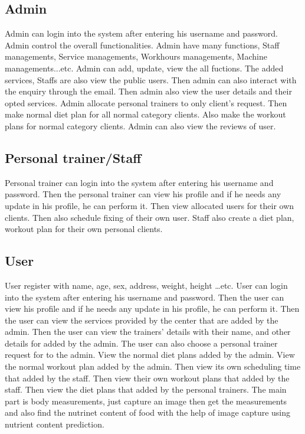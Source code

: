 \documentclass[a4paper,12pt,toc=flat]{report}
\begin{document}
{	\subsection{Admin}
	
	Admin can login into the system after entering his username and password. Admin control the overall functionalities. Admin have many functions, Staff managements, Service managements, Workhours managements, Machine managements...etc. Admin can add, update, view the all fuctions. The added services, Staffs are also view the public users. Then admin can also interact with the enquiry through the email. Then admin also view the user details and their opted services. Admin allocate personal trainers to only client’s request. Then make normal diet plan for all normal category clients. Also make the workout plans for normal category clients. Admin can also view the reviews of user.
	\subsection{Personal trainer/Staff}
	
	Personal trainer can login into the system after entering his username and password. Then the personal trainer can view his profile and if he needs any update in his profile, he can perform it. Then view allocated users for their own clients. Then also schedule fixing of their own user. Staff  also create a diet plan, workout plan  for their own personal clients.
	\pagebreak
	\subsection{ User}
	User register with name, age, sex, address, weight, height …etc.  User can login into the system after entering his username and password. Then the user can view his profile and if he needs any update in his profile, he can perform it. Then the user can view the services provided by the center that are added by the admin. Then the user can view the trainers’ details with their name, and other details for added by the admin. The user can also choose a personal trainer request for to the admin. View the normal diet plans added by the admin. View the normal workout plan added by the admin. Then view its own scheduling time that added by the staff. Then view their own workout plans that added by the staff. Then view the diet plans that added by the personal trainers. The main part is body measurements, just capture an image then get the measurements and also find the nutrinet content of food with the help of image capture using nutrient content prediction.   
	
}
\end{document}
